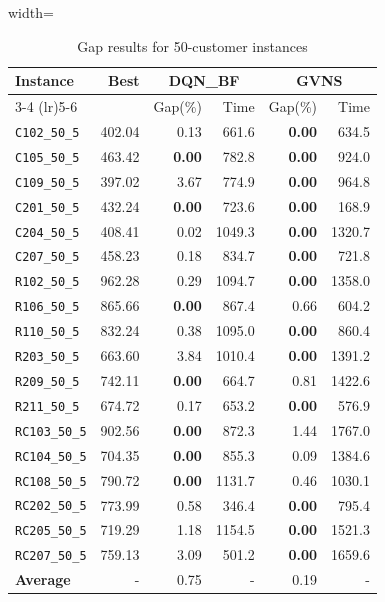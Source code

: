 \begin{table}[ht]
\centering
\small
\setlength{\tabcolsep}{5pt}
\caption{Gap results for 50-customer instances}
\vspace{4mm}
\begin{adjustbox}{width=\textwidth}
\begin{tabular}{l r r r @{\hspace{8pt}} r r @{\hspace{8pt}}}
\toprule
\multirow{2}{*}{Instance} & \multirow{2}{*}{Best} & \multicolumn{2}{c}{DQN\_BF} & \multicolumn{2}{c}{GVNS} \\
\cmidrule(lr){3-4} \cmidrule(lr){5-6}
 &  & Gap(\%) & Time & Gap(\%) & Time \\
\midrule
\texttt{C102\_50\_5} & 402.04 & 0.13 & 661.6 & \textbf{0.00} & 634.5 \\
\texttt{C105\_50\_5} & 463.42 & \textbf{0.00} & 782.8 & \textbf{0.00} & 924.0 \\
\texttt{C109\_50\_5} & 397.02 & 3.67 & 774.9 & \textbf{0.00} & 964.8 \\
\texttt{C201\_50\_5} & 432.24 & \textbf{0.00} & 723.6 & \textbf{0.00} & 168.9 \\
\texttt{C204\_50\_5} & 408.41 & 0.02 & 1049.3 & \textbf{0.00} & 1320.7 \\
\texttt{C207\_50\_5} & 458.23 & 0.18 & 834.7 & \textbf{0.00} & 721.8 \\
\texttt{R102\_50\_5} & 962.28 & 0.29 & 1094.7 & \textbf{0.00} & 1358.0 \\
\texttt{R106\_50\_5} & 865.66 & \textbf{0.00} & 867.4 & 0.66 & 604.2 \\
\texttt{R110\_50\_5} & 832.24 & 0.38 & 1095.0 & \textbf{0.00} & 860.4 \\
\texttt{R203\_50\_5} & 663.60 & 3.84 & 1010.4 & \textbf{0.00} & 1391.2 \\
\texttt{R209\_50\_5} & 742.11 & \textbf{0.00} & 664.7 & 0.81 & 1422.6 \\
\texttt{R211\_50\_5} & 674.72 & 0.17 & 653.2 & \textbf{0.00} & 576.9 \\
\texttt{RC103\_50\_5} & 902.56 & \textbf{0.00} & 872.3 & 1.44 & 1767.0 \\
\texttt{RC104\_50\_5} & 704.35 & \textbf{0.00} & 855.3 & 0.09 & 1384.6 \\
\texttt{RC108\_50\_5} & 790.72 & \textbf{0.00} & 1131.7 & 0.46 & 1030.1 \\
\texttt{RC202\_50\_5} & 773.99 & 0.58 & 346.4 & \textbf{0.00} & 795.4 \\
\texttt{RC205\_50\_5} & 719.29 & 1.18 & 1154.5 & \textbf{0.00} & 1521.3 \\
\texttt{RC207\_50\_5} & 759.13 & 3.09 & 501.2 & \textbf{0.00} & 1659.6 \\
\midrule
\textbf{Average} & - & 0.75 & - & 0.19 & - \\
\bottomrule
\end{tabular}
\end{adjustbox}
\end{table}
